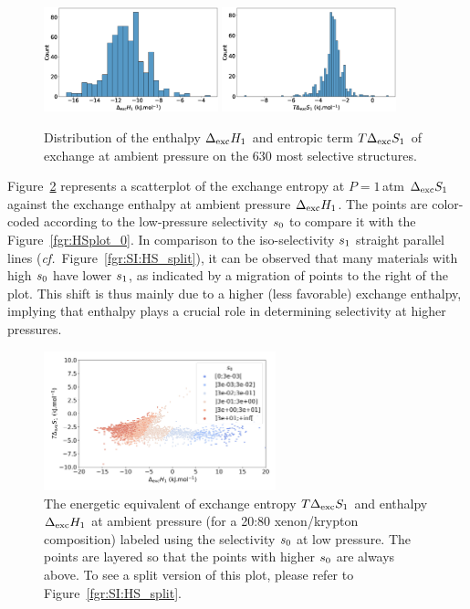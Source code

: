 \documentclass[main.tex]{subfiles}
\begin{document}
\begin{figure}[ht]
  \centering
    \includegraphics[width=0.45\textwidth]{figures/2-thermo/Delta_H_2080.jpg}
    \includegraphics[width=0.45\textwidth]{figures/2-thermo/T_Delta_S_2080.jpg}
    \caption{Distribution of the enthalpy $\Delta_{\text{exc}}H_{\text{1}}$ and entropic term $T\Delta_{\text{exc}}S_{\text{1}}$ of exchange at ambient pressure on the 630 most selective structures.}\label{fgr:SI:dist1}
\end{figure}

Figure~\ref{fgr:HSplot_1} represents a scatterplot of the exchange entropy at $P = 1$\,atm $\Delta_{\text{exc}}S_{\text{1}}$ against the exchange enthalpy at ambient pressure $\Delta_{\text{exc}}H_{\text{1}}$. The points are color-coded according to the low-pressure selectivity $s_{\text{0}}$ to compare it with the Figure~\ref{fgr:HSplot_0}. In comparison to the iso-selectivity $s_{\text{1}}$ straight parallel lines (\emph{cf.}~Figure~\ref{fgr:SI:HS_split}), it can be observed that many materials with high $s_{\text{0}}$ have lower $s_{\text{1}}$, as indicated by a migration of points to the right of the plot. This shift is thus mainly due to a higher (less favorable) exchange enthalpy, implying that enthalpy plays a crucial role in determining selectivity at higher pressures.

\begin{figure}[ht]
  \centering
    \includegraphics[width=0.6\textwidth]{figures/2-thermo/enthalpy_entropy_2080_s_0.jpg}
    \caption{The energetic equivalent of exchange entropy $T\Delta_{\text{exc}}S_{\text{1}}$ and enthalpy $\Delta_{\text{exc}}H_{\text{1}}$ at ambient pressure (for a 20:80 xenon/krypton composition) labeled using the selectivity $s_{\text{0}}$ at low pressure. The points are layered so that the points with higher $s_{\text{0}}$ are always above. To see a split version of this plot, please refer to Figure~\ref{fgr:SI:HS_split}.}\label{fgr:HSplot_1}
  \end{figure}
 
\end{document}
